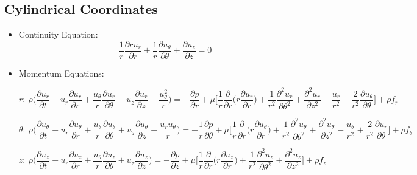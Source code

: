 \documentclass{article}
\begin{document}
    \subsection{Cylindrical Coordinates} 
        \begin{itemize}
            \item Continuity Equation:
            \[\frac{1}{r}\frac{\partial ru_{r}}{\partial r} + \frac{1}{r}\frac{\partial u_{\theta}}{\partial \theta} + \frac{\partial u_{z}}{\partial z}=0\]
            
            \item Momentum Equations:
            
            \[r: \ \rho \bigg(\frac{\partial u_{r}}{\partial t} + u_{r} \frac{\partial u_{r}}{\partial r} + \frac{u_{\theta}}{r}\frac{\partial u_{r}}{\partial \theta} + u_{z}\frac{\partial u_{r}}{\partial z} - \frac{u_{\theta}^{2}}{r} \bigg) = -\frac{\partial p}{\partial r} + \mu \bigg[ \frac{1}{r}\frac{\partial}{\partial r} \bigg(r \frac{\partial u_{r}}{\partial r}\bigg) + \frac{1}{r^{2}} \frac{\partial^{2} u_{r}}{\partial \theta^{2}} + \frac{\partial^{2} u_{r}}{\partial z^{2}} - \frac{u_{r}}{r^{2}} - \frac{2}{r^{2}}\frac{\partial u_{\theta}}{\partial \theta}\bigg] + \rho f_{r}\]
            
            \[\theta: \ \rho \bigg(\frac{\partial u_{\theta}}{\partial t} + u_{r} \frac{\partial u_{\theta}}{\partial r} + \frac{u_{\theta}}{r} \frac{\partial u_{\theta}}{\partial \theta} + u_{z}\frac{\partial u_{\theta}}{\partial z} + \frac{u_{r}u_{\theta}}{r} \bigg) = -\frac{1}{r} \frac{\partial p}{\partial \theta} + \mu \bigg[ \frac{1}{r}\frac{\partial}{\partial r} \bigg(r \frac{\partial u_{\theta}}{\partial r}\bigg) + \frac{1}{r^{2}} \frac{\partial^{2} u_{\theta}}{\partial \theta^{2}} + \frac{\partial^{2} u_{\theta}}{\partial z^{2}} - \frac{u_{\theta}}{r^{2}} + \frac{2}{r^{2}}\frac{\partial u_{r}}{\partial \theta}\bigg] + \rho f_{\theta}\]
            
            \[z: \ \rho \bigg(\frac{\partial u_{z}}{\partial t} + u_{r} \frac{\partial u_{z}}{\partial r} + \frac{u_{\theta}}{r}\frac{\partial u_{z}}{\partial \theta} + u_{z}\frac{\partial u_{z}}{\partial z} \bigg) = -\frac{\partial p}{\partial z} + \mu \bigg[ \frac{1}{r}\frac{\partial}{\partial r} \bigg(r \frac{\partial u_{z}}{\partial r}\bigg) + \frac{1}{r^{2}} \frac{\partial^{2} u_{z}}{\partial \theta^{2}} + \frac{\partial^{2} u_{z}}{\partial z^{2}} \bigg] + \rho f_{z}\]
        \end{itemize}
    
\end{document}
